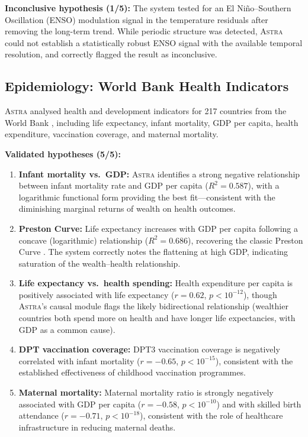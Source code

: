 \documentclass[usenatbib]{rasti}
\newcommand{\astra}{\textsc{Astra}\xspace}
\begin{document}
\textbf{Inconclusive hypothesis (1/5):}
The system tested for an El Ni\~{n}o--Southern Oscillation (ENSO) modulation signal in the temperature residuals after removing the long-term trend. While periodic structure was detected, \astra could not establish a statistically robust ENSO signal with the available temporal resolution, and correctly flagged the result as inconclusive.

\subsection{Epidemiology: World Bank Health Indicators}
\label{sec:crossdomain:epidemiology}

\astra analysed health and development indicators for 217 countries from the World Bank \citep{WorldBank2024}, including life expectancy, infant mortality, GDP per capita, health expenditure, vaccination coverage, and maternal mortality.

\textbf{Validated hypotheses (5/5):}
\begin{enumerate}
  \item[(i)] \textbf{Infant mortality vs.\ GDP:} \astra identifies a strong negative relationship between infant mortality rate and GDP per capita ($R^{2} = 0.587$), with a logarithmic functional form providing the best fit---consistent with the diminishing marginal returns of wealth on health outcomes.
  \item[(ii)] \textbf{Preston Curve:} Life expectancy increases with GDP per capita following a concave (logarithmic) relationship ($R^{2} = 0.686$), recovering the classic Preston Curve \citep{Preston1975}. The system correctly notes the flattening at high GDP, indicating saturation of the wealth--health relationship.
  \item[(iii)] \textbf{Life expectancy vs.\ health spending:} Health expenditure per capita is positively associated with life expectancy ($r = 0.62$, $p < 10^{-12}$), though \astra's causal module flags the likely bidirectional relationship (wealthier countries both spend more on health and have longer life expectancies, with GDP as a common cause).
  \item[(iv)] \textbf{DPT vaccination coverage:} DPT3 vaccination coverage is negatively correlated with infant mortality ($r = -0.65$, $p < 10^{-15}$), consistent with the established effectiveness of childhood vaccination programmes.
  \item[(v)] \textbf{Maternal mortality:} Maternal mortality ratio is strongly negatively associated with GDP per capita ($r = -0.58$, $p < 10^{-10}$) and with skilled birth attendance ($r = -0.71$, $p < 10^{-18}$), consistent with the role of healthcare infrastructure in reducing maternal deaths.
\end{enumerate}
\end{document}

